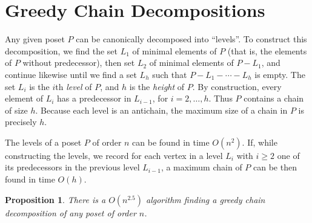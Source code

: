 \documentclass{article} \usepackage{fullpage}
\newtheorem{proposition}{Proposition}
\begin{document}



\appendix

\section{Greedy Chain Decompositions}
\label{app:greedy}

Any given poset $P$ can be canonically decomposed into ``levels''. To construct this decomposition, we find the set $L_1$ of minimal elements of $P$ (that is, the elements of $P$ without predecessor), then set $L_2$ of minimal elements of $P-L_1$, and continue likewise until we find a set $L_h$ such that $P-L_1-\cdots-L_h$ is empty. The set $L_i$ is the $i$th {\sl level\/} of $P$, and $h$ is the {\sl height\/} of $P$. By construction, every element of $L_i$ has a predecessor in $L_{i-1}$, for $i=2,\ldots,h$. Thus $P$ contains a chain of size $h$. Because each level is an antichain, the maximum size of a chain in $P$ is precisely $h$.

The levels of a poset $P$ of order $n$ can be found in time $O(n^2)$. If, while constructing the levels, we record for each vertex in a level $L_i$ with $i \ge 2$ one of its predecessors in the previous level $L_{i-1}$, a maximum chain of $P$ can be then found in time $O(h)$.

\begin{proposition}
There is a $O(n^{2.5})$ algorithm finding a greedy chain decomposition of any poset of order $n$.
\end{proposition}
\end{document}
